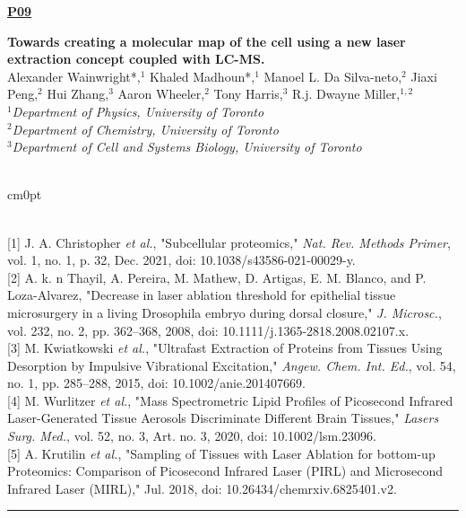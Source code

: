 \documentclass[titlepage,oneside,openany,10pt]{book}
\newenvironment{posterabswrefwfig}[8] %
        {
        \newcommand{\posterref}{#5}
	\FPeval{\cutw}{clip(16.7-#7)}
	\FPeval{\cutl}{round(#8/0.35+1,3)}
	\begin{flushright}
                \underline{\textbf{#4}}
        \end{flushright}
        \textbf{#1}\\%
        #2\\%
        \textit{#3}\\\\%
        \def\windowpagestuff{\centering
                \texttt{[image: \#6]}
	}
        \opencutright
        \begin{cutout}{0}{\cutw cm}{0pt}{\RoundingUpFunction{\cutl}}
        \noindent
	}
	{
	\end{cutout}
	\vspace{0.5cm}
	\\\noindent \posterref \\ \noindent\rule{15cm}{0.5pt}%
        }
\begin{document}
\begin{posterabswrefwfig}
	{Towards creating a molecular map of the cell using a new laser extraction concept coupled with LC-MS.}
	{Alexander Wainwright*,$^{1}$ Khaled Madhoun*,$^{1}$ Manoel L. Da Silva-neto,$^{2}$ Jiaxi Peng,$^{2}$ Hui Zhang,$^{3}$ Aaron Wheeler,$^{2}$ Tony Harris,$^{3}$ R.j. Dwayne Miller,$^{1,2}$}
	{
	$^1$Department of Physics, University of Toronto\\
	$^2$Department of Chemistry, University of Toronto\\
	$^3$Department of Cell and Systems Biology, University of Toronto
	}
	{P09}
	{
	{[1]} J. A. Christopher \emph{et al.}, "Subcellular proteomics," \emph{Nat. Rev. Methods Primer}, vol. 1, no. 1, p. 32, Dec. 2021, doi: 10.1038/s43586-021-00029-y.\\
	{[2]} A. k. n Thayil, A. Pereira, M. Mathew, D. Artigas, E. M. Blanco, and P. Loza-Alvarez, "Decrease in laser ablation threshold for epithelial tissue microsurgery in a living Drosophila embryo during dorsal closure," \emph{J. Microsc.}, vol. 232, no. 2, pp. 362--368, 2008, doi: 10.1111/j.1365-2818.2008.02107.x.\\
	{[3]} M. Kwiatkowski \emph{et al.}, "Ultrafast Extraction of Proteins from Tissues Using Desorption by Impulsive Vibrational Excitation," \emph{Angew. Chem. Int. Ed.}, vol. 54, no. 1, pp. 285--288, 2015, doi: 10.1002/anie.201407669.\\
	{[4]} M. Wurlitzer \emph{et al.}, "Mass Spectrometric Lipid Profiles of Picosecond Infrared Laser-Generated Tissue Aerosols Discriminate Different Brain Tissues," \emph{Lasers Surg. Med.}, vol. 52, no. 3, Art. no. 3, 2020, doi: 10.1002/lsm.23096.\\
	{[5]} A. Krutilin \emph{et al.}, "Sampling of Tissues with Laser Ablation for bottom-up Proteomics: Comparison of Picosecond Infrared Laser (PIRL) and Microsecond Infrared Laser (MIRL)," Jul. 2018, doi: 10.26434/chemrxiv.6825401.v2.
	}
	{abstract_figures/Wainwright_Alexander_Oral.png}
	{8.0}
	{7.0}

\end{posterabswrefwfig}
\end{document}
